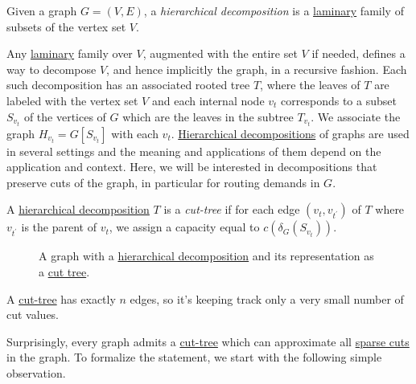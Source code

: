 \begin{definition}\label{def:hierarchical-decomposition}
	Given a graph \(G = (V, E)\), a \emph{hierarchical decomposition} is a \hyperref[def:laminary]{laminary} family of subsets of the vertex set \(V\).
\end{definition}

Any \hyperref[def:laminary]{laminary} family over \(V\), augmented with the entire set \(V\) if needed, defines a way to decompose \(V\), and hence implicitly the graph, in a recursive fashion. Each such decomposition has an associated rooted tree \(T\), where the leaves of \(T\) are labeled with the vertex set \(V\) and each internal node \(v_t\) corresponds to a subset \(S_{v_t}\) of the vertices of \(G\) which are the leaves in the subtree \(T_{v_t}\). We associate the graph \(H_{v_t} = G[S_{v_t}]\) with each \(v_t\). \hyperref[def:hierarchical-decomposition]{Hierarchical decompositions} of graphs are used in several settings and the meaning and applications of them depend on the application and context. Here, we will be interested in decompositions that preserve cuts of the graph, in particular for routing demands in \(G\).

\begin{definition}\label{def:cut-tree}
	A \hyperref[def:hierarchical-decomposition]{hierarchical decomposition} \(T\) is a \emph{cut-tree} if for each edge \((v_t, v_{t^{\prime} })\) of \(T\) where \(v_{t^{\prime} }\)  is the parent of \(v_t\), we assign a capacity equal to \(c(\delta _G(S_{v_t}))\).
\end{definition}

\begin{figure}[H]
	\centering
	\caption{A graph with a \hyperref[def:hierarchical-decomposition]{hierarchical decomposition} and its representation as a \hyperref[def:cut-tree]{cut tree}.}
	\label{fig:cut-tree}
\end{figure}

\begin{remark}
	A \hyperref[def:cut-tree]{cut-tree} has exactly \(n\) edges, so it's keeping track only a very small number of cut values.
\end{remark}

Surprisingly, every graph admits a \hyperref[def:cut-tree]{cut-tree} which can approximate all \hyperref[prb:sparsest-cut]{sparse cuts} in the graph. To formalize the statement, we start with the following simple observation.

